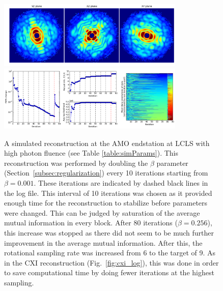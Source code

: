 \documentclass[]{iucr}              %
\begin{document}
\begin{figure}
\caption{A simulated reconstruction at the AMO endstation at LCLS with high photon fluence (see Table \ref{table:simParams}). This reconstruction was performed by doubling the $\beta$ parameter (Section~\ref{subsec:regularization}) every 10 iterations starting from $\beta=0.001$. These iterations are indicated by dashed black lines in the log file. This interval of 10 iterations was chosen as it provided enough time for the reconstruction to stabilize before parameters were changed. This can be judged by saturation of the average mutual information in every block. After 80 iterations ($\beta = 0.256$), this increase was stopped as there did not seem to be much further improvement in the average mutual information. After this, the rotational sampling rate was increased from 6 to the target of 9. As in the CXI reconstruction (Fig.~\ref{fig:cxi_log}), this was done in order to save computational time by doing fewer iterations at the highest sampling.}
\includegraphics[width=3.5in]{figures/amo_high_intens.png} \label{fig:amo_high_intens}
\includegraphics[width=3.5in]{figures/amo_high_log.png} \label{fig:amo_high_log}
\end{figure}
\end{document}
